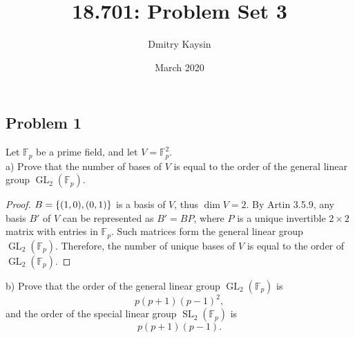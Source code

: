 \documentclass{article}
\title{18.701: Problem Set 3}
\author{Dmitry Kaysin}
\date{March 2020}
\theoremstyle{definition}
\newcommand{\F}{\mathbb{F}}
\newcommand{\GL}{\operatorname{GL}}
\newcommand{\SL}{\operatorname{SL}}
\DeclarePairedDelimiter\set{\{}{\}}
\begin{document}
\maketitle 


\subsection*{Problem 1}

\begin{tcolorbox}
Let $\F_p$ be a prime field, and let $V = \F_p^2$.
\\

a) Prove that the number of bases of $V$ is equal to the order of the general linear group $\GL_2(\F_p)$.
\end{tcolorbox}

\begin{proof}

$B = \set{(1,0), (0,1)}$ is a basis of $V$, thus $\dim V = 2$.
By Artin 3.5.9, any basis $B'$ of $V$ can be represented as $B' = BP$, where $P$ is a unique invertible $2 \times 2$ matrix with entries in $\F_p$.
Such matrices form the general linear group $\GL_2(\F_p)$.
Therefore, the number of unique bases of $V$ is equal to the order of $\GL_2(\F_p)$.

\end{proof}

\begin{tcolorbox}
b) Prove that the order of the general linear group $\GL_2(\F_p)$ is 
\[ p(p+1)(p-1)^2, \]
and the order of the special linear group $\SL_2(\F_p)$ is
\[ p(p+1)(p-1). \]
\end{tcolorbox}
\end{document}

